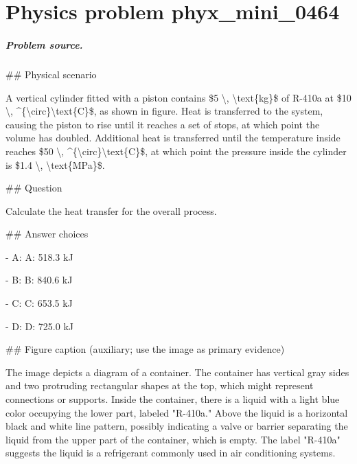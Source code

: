 
\chapter{Physics problem phyx\_mini\_0464}
\label{ch:PhyXMiniProblems_problem_phyx_mini_0464}

\paragraph{Problem source.}
\#\# Physical scenario

A vertical cylinder fitted with a piston contains \$5 \textbackslash{}, \textbackslash{}text\{kg\}\$ of R-410a at \$10 \textbackslash{}, \textasciicircum{}\{\textbackslash{}circ\}\textbackslash{}text\{C\}\$, as shown in figure. Heat is transferred to the system, causing the piston to rise until it reaches a set of stops, at which point the volume has doubled. Additional heat is transferred until the temperature inside reaches \$50 \textbackslash{}, \textasciicircum{}\{\textbackslash{}circ\}\textbackslash{}text\{C\}\$, at which point the pressure inside the cylinder is \$1.4 \textbackslash{}, \textbackslash{}text\{MPa\}\$.

\#\# Question

Calculate the heat transfer for the overall process.

\#\# Answer choices

- A: A: 518.3 kJ

- B: B: 840.6 kJ

- C: C: 653.5 kJ

- D: D: 725.0 kJ

\#\# Figure caption (auxiliary; use the image as primary evidence)

The image depicts a diagram of a container. The container has vertical gray sides and two protruding rectangular shapes at the top, which might represent connections or supports. Inside the container, there is a liquid with a light blue color occupying the lower part, labeled "R-410a." Above the liquid is a horizontal black and white line pattern, possibly indicating a valve or barrier separating the liquid from the upper part of the container, which is empty. The label "R-410a" suggests the liquid is a refrigerant commonly used in air conditioning systems.


